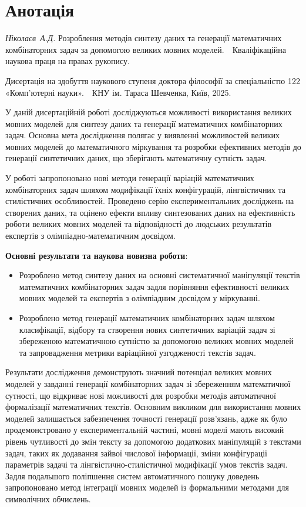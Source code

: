 %
\chapter*{Анотація}

\emph{Ніколаєв~А.Д.} Розроблення методів синтезу даних та генерації математичних комбінаторних задач за допомогою великих мовних моделей.~\textbf{\textemdash}~Кваліфікаційна наукова праця на правах рукопису.

Дисертація на здобуття наукового ступеня доктора філософії за спеціальністю 122 «Комп'ютерні науки».~\textbf{\textemdash}~КНУ ім. Тараса Шевченка, Київ, 2025.

У даній дисертаційній роботі досліджуються можливості використання великих мовних моделей для синтезу даних та генерації математичних комбінаторних задач. Основна мета дослідження полягає у виявленні можливостей великих мовних моделей до математичного міркування та розробки ефективних методів до генерації синтетичних даних, що зберігають математичну сутність задач.

У роботі запропоновано нові методи генерації варіацій математичних комбінаторних задач шляхом модифікації їхніх конфігурацій, лінгвістичних та стилістичних особливостей. Проведено серію експериментальних досліджень на створених даних, та оцінено ефекти впливу синтезованих даних на ефективність роботи великих мовних моделей та відповідності до людських результатів експертів з олімпіадно-математичним досвідом.

\textbf{Основні результати та наукова новизна роботи}:
\begin{itemize}
    \item Розроблено метод синтезу даних на основні систематичної маніпуляції текстів математичних комбінаторних задач задля порівняння ефективності великих мовних моделей та експертів з олімпіадним досвідом у міркуванні.
    \item Розроблено метод генерації математичних комбінаторних задач шляхом класифікації, відбору та створення нових синтетичних варіацій задач зі збереженою математичною сутністю за допомогою великих мовних моделей та запровадження метрики варіаційної узгодженості текстів задач.
\end{itemize}

Результати дослідження демонструють значний потенціал великих мовних моделей у завданні генерації комбінаторних задач зі збереженням математичної сутності, що відкриває нові можливості для розробки методів автоматичної формалізації математичних текстів. Основним викликом для використання мовних моделей залишається забезпечення точності генерації розв'язань, адже як було продемонстровано у експериментальній частині, мовні моделі мають високий рівень чутливості до змін тексту за допомогою додаткових маніпуляцій з текстами задач, таких як додавання зайвої числової інформації, зміни конфігурації параметрів задачі та лінгвістично-стилістичної модифікації умов текстів задач. Задля подальшого поліпшення систем автоматичного пошуку доведень запропоновано метод інтеграції мовних моделей із формальними методами для символічних обчислень.

